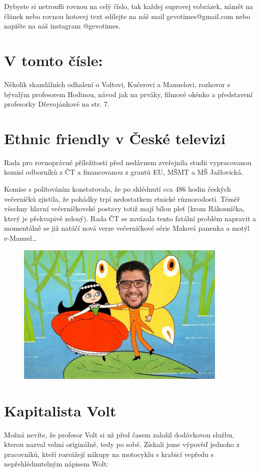 \documentclass[twoside, 11pt]{article}
\begin{document}
 Dybyste si netroufli rovnou na celý číslo, tak každej suprovej vobrázek,
 námět na článek nebo rovnou hotovej text sdílejte na náš mail gevotimes@gmail.com nebo napište na náš instagram @gevotimes.

 \vspace{10pt}
\section*{V tomto čísle:}
Několik skandálních odhalení o Voltovi, Kučerovi a Manuelovi, rozhovor s bývalým profesorem Hodinou, návod jak na prváky, filmové okénko a představení profesorky Dřevojánkové na str. 7.

\clearpage
\section*{Ethnic friendly v České televizi}
Rada pro rovnoprávné příležitosti před nedávnem
zveřejnila studii vypracovanou komisí odborníků z
ČT a financovanou z grantů EU, MŠMT a MŠ
Jažlovická.


Komise s politováním konstatovala, že po shlédnutí
cca 486 hodin českých večerníčků zjistila, že
pohádky trpí nedostatkem etnické různorodosti.
Téměř všechny hlavní večerníčkovské postavy totiž
mají bílou pleť (krom Rákosníčka, který je
překvapivě zelený). Rada ČT se zavázala tento
fatální problém napravit a momentálně se již natáčí
nová verze večerníčkové série Maková panenka a
motýl e-Manuel\dots


\begin{figure}[htbp]
    \centering
    \includegraphics[width=0.9\textwidth]{emanuel}
\end{figure}

\chead{}
\clearpage
\section*{Kapitalista Volt}
Možná nevíte, že profesor Volt si už před časem založil dodávkovou službu, kterou nazval velmi
originálně, tedy po sobě. Získali jsme výpověď jednoho z pracovníků, kteří rozvážejí nákupy na
motocyklu s krabicí vepředu s nepřehlédnutelným nápisem Wolt:
\end{document}
